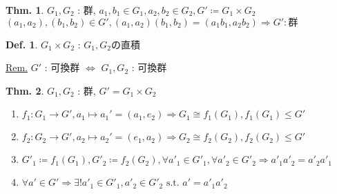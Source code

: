 \documentclass[uplatex,dvipdfmx,9pt]{beamer}
\newcommand{\st}{\text{ s.t. }}
\theoremstyle{definition} %
\newtheorem{defn}{Def.}[subsection] %
\newtheorem{thm}{Thm.}[subsection] %
\theoremstyle{example}
\begin{document}
      \begin{frame}
        
        \begin{thm}
          $G_1, G_2$ : 群, $a_1, b_1 \in G_1, a_2, b_2 \in G_2, G' \coloneqq G_1 \times G_2$ \\
          $(a_1, a_2), (b_1, b_2) \in G', (a_1, a_2)(b_1, b_2) = (a_1b_1, a_2b_2) \Rightarrow G' : \text{群}$
        \end{thm}

        \begin{defn}
          $G_1 \times G_2$ : $G_1, G_2$の\alert{直積}
        \end{defn}
        \underline{Rem.} $G'$ : 可換群 $\Leftrightarrow$ $G_1, G_2$ : 可換群

        \begin{thm}
          $G_1, G_2$ : 群, $G' = G_1 \times G_2$
          \begin{enumerate}
            \item $f_1 \colon G_1 \to G', a_1 \mapsto a_1' = (a_1, e_2) \Rightarrow G_1 \cong f_1(G_1), f_1(G_1) \le G'$
            \item $f_2 \colon G_2 \to G', a_2 \mapsto a_2' = (e_1, a_2) \Rightarrow G_2 \cong f_2(G_2), f_2(G_2) \le G'$
            \item $G'_1 \coloneqq f_1(G_1), G'_2 \coloneqq f_2(G_2), \forall a'_1 \in G'_1, \forall a'_2 \in G'_2 \Rightarrow a'_1a'_2 = a'_2a'_1$
            \item $\forall a' \in G' \Rightarrow \exists! a'_1 \in G'_1, a'_2 \in G'_2 \st a' = a'_1a'_2$
          \end{enumerate}
        \end{thm}

      \end{frame}
\end{document}
